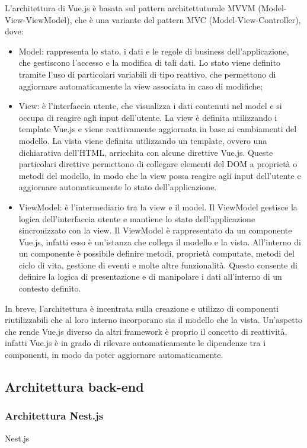 L'architettura di Vue.js è basata sul pattern architettuturale MVVM (Model-View-ViewModel), che è una variante del pattern MVC (Model-View-Controller), dove:
\begin{itemize}
  \item Model: rappresenta lo stato, i dati e le regole di business dell'applicazione, che gestiscono l'accesso e la modifica di tali dati. Lo stato viene definito tramite l'uso
  di particolari variabili di tipo reattivo, che permettono di aggiornare automaticamente la view associata in caso di modifiche;
  \item View: è l'interfaccia utente, che visualizza i dati contenuti nel model e si occupa di reagire agli input dell'utente. La view è definita utilizzando i template Vue.js 
  e viene reattivamente aggiornata in base ai cambiamenti del modello. La vista viene definita utilizzando un template, ovvero una dichiarativa dell'HTML, arricchita con alcune direttive Vue.js. 
  Queste particolari direttive permettono di collegare elementi del DOM a proprietà o metodi del modello, in modo che la view possa reagire agli input dell'utente e aggiornare automaticamente lo stato dell'applicazione.
  \item ViewModel: è l'intermediario tra la view e  il model. Il ViewModel gestisce la logica dell'interfaccia utente e mantiene lo stato dell'applicazione sincronizzato con la view.
  Il ViewModel è rappresentato da un componente Vue.js, infatti esso è un'istanza che collega il modello e la vista. All'interno di un componente è possibile definire metodi, proprietà 
  computate, metodi del ciclo di vita, gestione di eventi e molte altre funzionalità. Questo consente di definire la logica di presentazione e di manipolare i dati all'interno di un contesto definito.
\end{itemize}

In breve, l'architettura è incentrata sulla creazione e utilizzo di componenti riutilizzabili che al loro interno incorporano sia il modello che la vista. Un'aspetto che rende Vue.js
diverso da altri framework è proprio il concetto di reattività, infatti Vue.js è in grado di rilevare automaticamente le dipendenze tra i componenti, in modo da poter aggiornare automaticamente.

\subsection{Architettura back-end}\label{subsec:architettura-back-end}
\subsubsection{Architettura Nest.js}\label{subsubsec:architettura-nest.js}
Nest.js 

